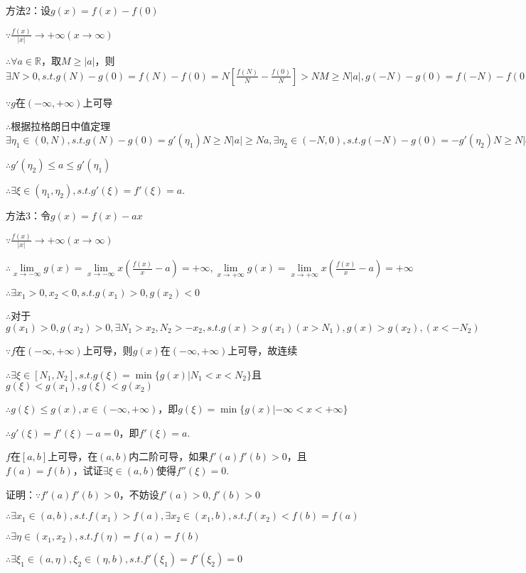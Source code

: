 \documentclass[12pt,UTF8]{ctexart}
\begin{document}
\begin{enumerate}
方法2：设$g(x)=f(x)-f(0)$

$\because\frac{f(x)}{|x|}\rightarrow+\infty(x\rightarrow\infty)$

$\therefore\forall a\in\mathbb R$，取$M\geq|a|$，则$\exists N>0,s.t.g(N)-g(0)=f(N)-f(0)=N[\frac{f(N)}N-\frac{f(0)}N]>NM\geq N|a|,g(-N)-g(0)=f(-N)-f(0)=N[\frac{f(-N)}N-\frac{f(0)}N]>NM\geq N|a|$

$\because g$在$(-\infty,+\infty)$上可导

$\therefore$根据拉格朗日中值定理$\exists\eta_1\in(0,N),s.t.g(N)-g(0)=g'(\eta_1)N\geq N|a|\geq Na,\exists\eta_2\in(-N,0),s.t.g(-N)-g(0)=-g'(\eta_2)N\geq N|a|\geq-Na$

$\therefore g'(\eta_2)\leq a\leq g'(\eta_1)$

$\therefore\exists\xi\in(\eta_1,\eta_2),s.t.g'(\xi)=f'(\xi)=a$.

方法3：令$g(x)=f(x)-ax$

$\because\frac{f(x)}{|x|}\rightarrow+\infty(x\rightarrow\infty)$

$\therefore\lim\limits_{x\rightarrow-\infty}g(x)=\lim\limits_{x\rightarrow-\infty}x(\frac{f(x)}x-a)=+\infty,\lim\limits_{x\rightarrow+\infty}g(x)=\lim\limits_{x\rightarrow+\infty}x(\frac{f(x)}x-a)=+\infty$

$\therefore\exists x_1>0,x_2<0,s.t.g(x_1)>0,g(x_2)<0$

$\therefore$对于$g(x_1)>0,g(x_2)>0,\exists N_1>x_2,N_2>-x_2,s.t.g(x)>g(x_1)(x>N_1),g(x)>g(x_2),(x<-N_2)$

$\because f$在$(-\infty,+\infty)$上可导，则$g(x)$在$(-\infty,+\infty)$上可导，故连续

$\therefore\exists\xi\in[N_1,N_2],s.t.g(\xi)=\min\{g(x)|N_1<x<N_2\}$且$g(\xi)<g(x_1),g(\xi)<g(x_2)$

$\therefore g(\xi)\leq g(x),x\in(-\infty,+\infty)$，即$g(\xi)=\min\{g(x)|-\infty<x<+\infty\}$

$\therefore g'(\xi)=f'(\xi)-a=0$，即$f'(\xi)=a$.

$f$在$[a,b]$上可导，在$(a,b)$内二阶可导，如果$f'(a)f'(b)>0$，且$f(a)=f(b)$，试证$\exists\xi\in(a,b)$使得$f''(\xi)=0$.

证明：$\because f'(a)f'(b)>0$，不妨设$f'(a)>0,f'(b)>0$

$\therefore\exists x_1\in(a,b),s.t.f(x_1)>f(a),\exists x_2\in(x_1,b),s.t.f(x_2)<f(b)=f(a)$

$\therefore\exists\eta\in(x_1,x_2),s.t.f(\eta)=f(a)=f(b)$

$\therefore\exists\xi_1\in(a,\eta),\xi_2\in(\eta,b),s.t.f'(\xi_1)=f'(\xi_2)=0$


\end{enumerate}
\end{document}
